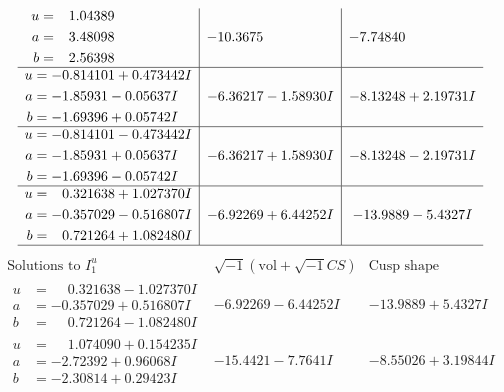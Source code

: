 \documentclass[1p]{elsarticle_modified}
\theoremstyle{definition}
\newcommand{\I}{\sqrt{-1}}
\begin{document}
$$\begin{array}{c|c|c}
\begin{aligned}
u &= \phantom{-}1.04389\phantom{ +0.000000I} \\
a &= \phantom{-}3.48098\phantom{ +0.000000I} \\
b &= \phantom{-}2.56398\phantom{ +0.000000I}\end{aligned}
 & -10.3675\phantom{ +0.000000I} & -7.74840\phantom{ +0.000000I} \\ \hline\begin{aligned}
u &= -0.814101 + 0.473442 I \\
a &= -1.85931 - 0.05637 I \\
b &= -1.69396 + 0.05742 I\end{aligned}
 & -6.36217 - 1.58930 I & -8.13248 + 2.19731 I \\ \hline\begin{aligned}
u &= -0.814101 - 0.473442 I \\
a &= -1.85931 + 0.05637 I \\
b &= -1.69396 - 0.05742 I\end{aligned}
 & -6.36217 + 1.58930 I & -8.13248 - 2.19731 I \\ \hline\begin{aligned}
u &= \phantom{-}0.321638 + 1.027370 I \\
a &= -0.357029 - 0.516807 I \\
b &= \phantom{-}0.721264 + 1.082480 I\end{aligned}
 & -6.92269 + 6.44252 I & -13.9889 - 5.4327 I\\
 \hline 
 \end{array}$$\newpage$$\begin{array}{c|c|c}  
\text{Solutions to }I^u_{1}& \I (\text{vol} + \sqrt{-1}CS) & \text{Cusp shape}\\
 \hline 
\begin{aligned}
u &= \phantom{-}0.321638 - 1.027370 I \\
a &= -0.357029 + 0.516807 I \\
b &= \phantom{-}0.721264 - 1.082480 I\end{aligned}
 & -6.92269 - 6.44252 I & -13.9889 + 5.4327 I \\ \hline\begin{aligned}
u &= \phantom{-}1.074090 + 0.154235 I \\
a &= -2.72392 + 0.96068 I \\
b &= -2.30814 + 0.29423 I\end{aligned}
 & -15.4421 - 7.7641 I & -8.55026 + 3.19844 I \\ \hline\begin{aligned}

\end{aligned}
\end{array}$$
\end{document}
